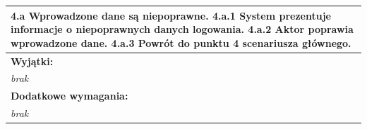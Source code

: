 \begin{center}
\begin{longtable}[h]{|p{1.6cm}|p{13.5cm}|}
\multicolumn{2}{|p{15.1cm}|}{
4.a Wprowadzone dane są niepoprawne. \newline
4.a.1 System prezentuje informacje o niepoprawnych danych logowania. \newline
4.a.2 Aktor poprawia wprowadzone dane. \newline
4.a.3 Powrót do punktu 4 scenariusza głównego.
} \\ \hline
\multicolumn{2}{|p{15.1cm}|}{\textbf{Wyjątki:}} \\
\multicolumn{2}{|p{15.1cm}|}{
\textit{brak}
} \\ \hline
\multicolumn{2}{|p{15.1cm}|}{\textbf{Dodatkowe wymagania:}} \\
\multicolumn{2}{|p{15.1cm}|}{
\textit{brak}
} \\
\hline
\end{longtable}
\end{center}

